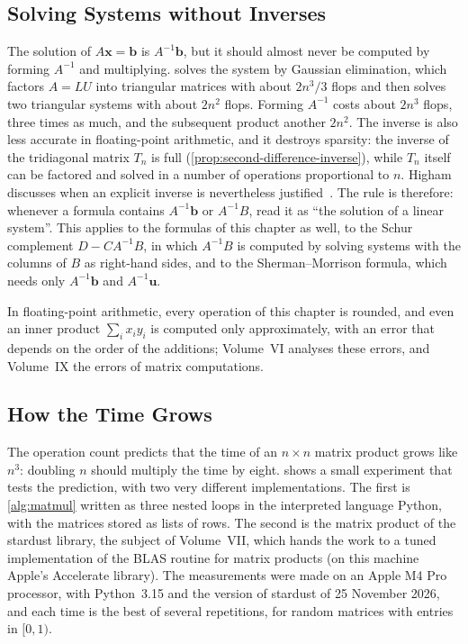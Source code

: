\subsection{Solving Systems without Inverses}

The solution of $A\mathbf x=\mathbf b$ is $A^{-1}\mathbf b$, but it should almost never be computed by forming $A^{-1}$ and multiplying.  solves the system by Gaussian elimination, which factors $A=LU$ into triangular matrices with about $2n^3/3$ flops and then solves two triangular systems with about $2n^2$ flops. Forming $A^{-1}$ costs about $2n^3$ flops, three times as much, and the subsequent product another $2n^2$. The inverse is also less accurate in floating-point arithmetic, and it destroys sparsity: the inverse of the tridiagonal matrix $T_n$ is full (\cref{prop:second-difference-inverse}), while $T_n$ itself can be factored and solved in a number of operations proportional to $n$. Higham discusses when an explicit inverse is nevertheless justified~\cite[Chap.~14]{higham2002accuracy}. The rule is therefore: whenever a formula contains $A^{-1}\mathbf b$ or $A^{-1}B$, read it as ``the solution of a linear system''. This applies to the formulas of this chapter as well, to the Schur complement $D-CA^{-1}B$, in which $A^{-1}B$ is computed by solving systems with the columns of $B$ as right-hand sides, and to the Sherman--Morrison formula, which needs only $A^{-1}\mathbf b$ and $A^{-1}\mathbf u$.

In floating-point arithmetic, every operation of this chapter is rounded, and even an inner product $\sum_ix_iy_i$ is computed only approximately, with an error that depends on the order of the additions; Volume~VI analyses these errors, and Volume~IX the errors of matrix computations.

\subsection{How the Time Grows}

The operation count predicts that the time of an $n\times n$ matrix product grows like $n^3$: doubling $n$ should multiply the time by eight.  shows a small experiment that tests the prediction, with two very different implementations. The first is \cref{alg:matmul} written as three nested loops in the interpreted language Python, with the matrices stored as lists of rows. The second is the matrix product of the stardust library, the subject of Volume~VII, which hands the work to a tuned implementation of the BLAS routine for matrix products (on this machine Apple's Accelerate library). The measurements were made on an Apple M4 Pro processor, with Python~3.15 and the version of stardust of 25 November 2026, and each time is the best of several repetitions, for random matrices with entries in $[0,1)$.

